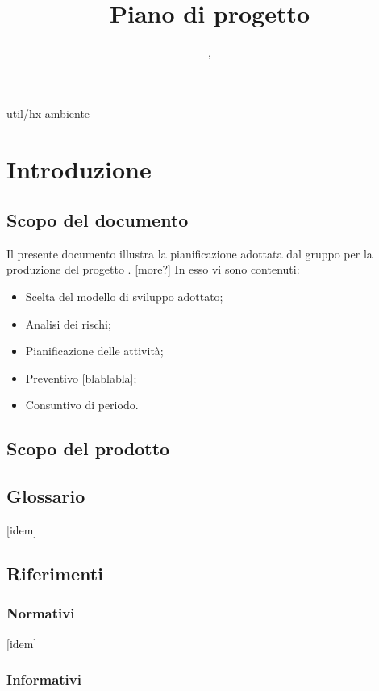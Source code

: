 
 {util/hx-ambiente}
\author{\LB, \PB}
\supervisor{\GG, \MM}
\title{Piano di progetto}

\renewcommand{\arraystretch}{1.5}
\setcounter{tocdepth}{4}
\setcounter{secnumdepth}{4}


\maketitle

\tableofcontents

\section{Introduzione}
	\subsection{Scopo del documento}
	Il presente documento illustra la pianificazione adottata dal gruppo {\hx} per la produzione del progetto {\proj}. [more?] In esso vi sono contenuti:
\begin{itemize}
	\item Scelta del modello di sviluppo adottato;
	\item Analisi dei rischi;
	\item Pianificazione delle attività;
	\item Preventivo [blablabla];
    \item Consuntivo di periodo.
\end{itemize}

	\subsection{Scopo del prodotto}
	\scopo
	\subsection{Glossario}
	[idem]
	\subsection{Riferimenti}
		\subsubsection{Normativi}
		[idem]
		\subsubsection{Informativi}


